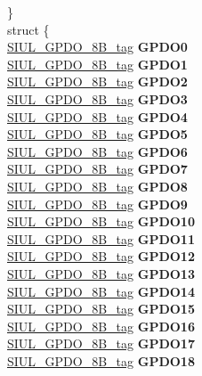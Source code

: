 \begin{DoxyCompactItemize}
\begin{tabbing}
\>\} \\
\mbox{\label{unionSIU__tag_1_1_0D1542_aaca60ba73964e4cb3938f0a1647461ca}} 
\>struct \{\\
\>\>\mbox{\hyperlink{unionSIUL__GPDO__8B__tag}{SIUL\_GPDO\_8B\_tag}} {\bfseries GPDO0}\\
\>\>\mbox{\hyperlink{unionSIUL__GPDO__8B__tag}{SIUL\_GPDO\_8B\_tag}} {\bfseries GPDO1}\\
\>\>\mbox{\hyperlink{unionSIUL__GPDO__8B__tag}{SIUL\_GPDO\_8B\_tag}} {\bfseries GPDO2}\\
\>\>\mbox{\hyperlink{unionSIUL__GPDO__8B__tag}{SIUL\_GPDO\_8B\_tag}} {\bfseries GPDO3}\\
\>\>\mbox{\hyperlink{unionSIUL__GPDO__8B__tag}{SIUL\_GPDO\_8B\_tag}} {\bfseries GPDO4}\\
\>\>\mbox{\hyperlink{unionSIUL__GPDO__8B__tag}{SIUL\_GPDO\_8B\_tag}} {\bfseries GPDO5}\\
\>\>\mbox{\hyperlink{unionSIUL__GPDO__8B__tag}{SIUL\_GPDO\_8B\_tag}} {\bfseries GPDO6}\\
\>\>\mbox{\hyperlink{unionSIUL__GPDO__8B__tag}{SIUL\_GPDO\_8B\_tag}} {\bfseries GPDO7}\\
\>\>\mbox{\hyperlink{unionSIUL__GPDO__8B__tag}{SIUL\_GPDO\_8B\_tag}} {\bfseries GPDO8}\\
\>\>\mbox{\hyperlink{unionSIUL__GPDO__8B__tag}{SIUL\_GPDO\_8B\_tag}} {\bfseries GPDO9}\\
\>\>\mbox{\hyperlink{unionSIUL__GPDO__8B__tag}{SIUL\_GPDO\_8B\_tag}} {\bfseries GPDO10}\\
\>\>\mbox{\hyperlink{unionSIUL__GPDO__8B__tag}{SIUL\_GPDO\_8B\_tag}} {\bfseries GPDO11}\\
\>\>\mbox{\hyperlink{unionSIUL__GPDO__8B__tag}{SIUL\_GPDO\_8B\_tag}} {\bfseries GPDO12}\\
\>\>\mbox{\hyperlink{unionSIUL__GPDO__8B__tag}{SIUL\_GPDO\_8B\_tag}} {\bfseries GPDO13}\\
\>\>\mbox{\hyperlink{unionSIUL__GPDO__8B__tag}{SIUL\_GPDO\_8B\_tag}} {\bfseries GPDO14}\\
\>\>\mbox{\hyperlink{unionSIUL__GPDO__8B__tag}{SIUL\_GPDO\_8B\_tag}} {\bfseries GPDO15}\\
\>\>\mbox{\hyperlink{unionSIUL__GPDO__8B__tag}{SIUL\_GPDO\_8B\_tag}} {\bfseries GPDO16}\\
\>\>\mbox{\hyperlink{unionSIUL__GPDO__8B__tag}{SIUL\_GPDO\_8B\_tag}} {\bfseries GPDO17}\\
\>\>\mbox{\hyperlink{unionSIUL__GPDO__8B__tag}{SIUL\_GPDO\_8B\_tag}} {\bfseries GPDO18}\\

\end{tabbing}
\end{DoxyCompactItemize}
